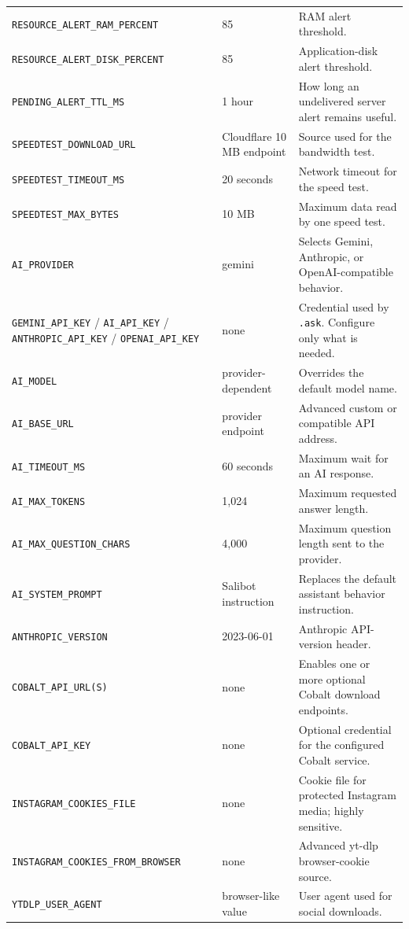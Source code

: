 \documentclass[11pt,a4paper]{article}
\begin{document}
\begin{longtable}{p{}p{}p{}}
\texttt{RESOURCE\_ALERT\_RAM\_PERCENT} & 85 & RAM alert threshold.\\
\nolinkurl{RESOURCE_ALERT_DISK_PERCENT} & 85 & Application-disk alert threshold.\\
\texttt{PENDING\_ALERT\_TTL\_MS} & 1 hour & How long an undelivered server alert remains useful.\\
\texttt{SPEEDTEST\_DOWNLOAD\_URL} & Cloudflare 10 MB endpoint & Source used for the bandwidth test.\\
\texttt{SPEEDTEST\_TIMEOUT\_MS} & 20 seconds & Network timeout for the speed test.\\
\texttt{SPEEDTEST\_MAX\_BYTES} & 10 MB & Maximum data read by one speed test.\\
\texttt{AI\_PROVIDER} & gemini & Selects Gemini, Anthropic, or OpenAI-compatible behavior.\\
\texttt{GEMINI\_API\_KEY} / \texttt{AI\_API\_KEY} / \texttt{ANTHROPIC\_API\_KEY} / \texttt{OPENAI\_API\_KEY} & none & Credential used by \texttt{.ask}. Configure only what is needed.\\
\texttt{AI\_MODEL} & provider-dependent & Overrides the default model name.\\
\texttt{AI\_BASE\_URL} & provider endpoint & Advanced custom or compatible API address.\\
\texttt{AI\_TIMEOUT\_MS} & 60 seconds & Maximum wait for an AI response.\\
\texttt{AI\_MAX\_TOKENS} & 1,024 & Maximum requested answer length.\\
\texttt{AI\_MAX\_QUESTION\_CHARS} & 4,000 & Maximum question length sent to the provider.\\
\texttt{AI\_SYSTEM\_PROMPT} & Salibot instruction & Replaces the default assistant behavior instruction.\\
\texttt{ANTHROPIC\_VERSION} & 2023-06-01 & Anthropic API-version header.\\
\texttt{COBALT\_API\_URL(S)} & none & Enables one or more optional Cobalt download endpoints.\\
\texttt{COBALT\_API\_KEY} & none & Optional credential for the configured Cobalt service.\\
\texttt{INSTAGRAM\_COOKIES\_FILE} & none & Cookie file for protected Instagram media; highly sensitive.\\
\nolinkurl{INSTAGRAM_COOKIES_FROM_BROWSER} & none & Advanced yt-dlp browser-cookie source.\\
\texttt{YTDLP\_USER\_AGENT} & browser-like value & User agent used for social downloads.\\

\end{longtable}
\end{document}
